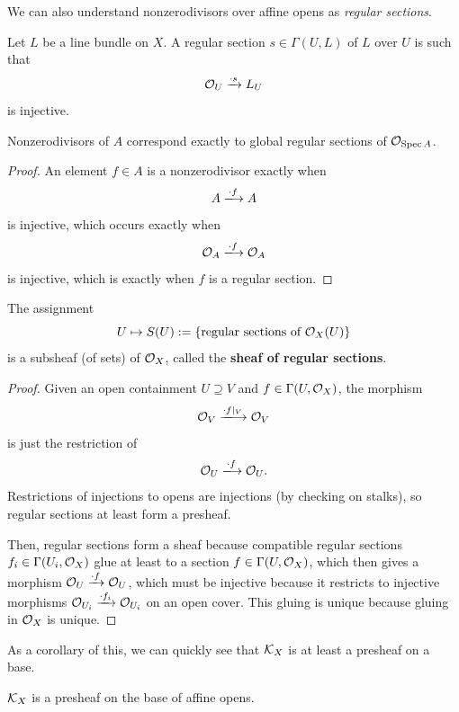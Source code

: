 \documentclass[12pt]{article}
\begin{document}
We can also understand nonzerodivisors over affine opens as \textit{regular sections}.
\begin{defn}
    Let $L$ be a line bundle on $X$. A regular section $s\in \Gamma(U,L)$ of $L$ over $U$ is such that
    \[\mathcal{O}_U \xrightarrow{\cdot s} L_U\]
    is injective.
\end{defn}

\begin{prop}
    Nonzerodivisors of $A$ correspond exactly to global regular sections of $\mathcal{O}_{\operatorname{Spec} A}$.
\end{prop}
\begin{proof}
    An element $f\in A$ is a nonzerodivisor exactly when
    \[A \xlongrightarrow{\cdot f} A\]
    is injective, which occurs exactly when
    \[\cO_A \xlongrightarrow{\cdot f} \cO_A\]
    is injective, which is exactly when $f$ is a regular section.
\end{proof}

\begin{prop}
    The assignment
    \[U \mapsto S(U):= \{\text{regular sections of $\mathcal{O}_X(U)$}\}\]
    is a subsheaf (of sets) of $\mathcal{O}_X$, called the \textbf{sheaf of regular sections}.
\end{prop}

\begin{proof}
    Given an open containment $U\supseteq V$ and $f\in \Gamma(U,\mathcal{O}_X)$, the morphism
    \[\cO_V \xlongrightarrow{\cdot f|_V} \cO_V\]
    is just the restriction of
    \[\cO_U \xlongrightarrow{\cdot f} \cO_U.\]
    Restrictions of injections to opens are injections (by checking on stalks), so regular sections at least form a presheaf.

    Then, regular sections form a sheaf because compatible regular sections $f_i\in \Gamma(U_i,\mathcal{O}_X)$ glue at least to a section $f\in \Gamma(U,\mathcal{O}_X)$, which then gives a morphism $\mathcal{O}_U\xrightarrow{\cdot f} \mathcal{O}_U$, which must be injective because it restricts to injective morphisms $\mathcal{O}_{U_i} \xrightarrow{\cdot f_i} \mathcal{O}_{U_i}$ on an open cover. This gluing is unique because gluing in $\mathcal{O}_X$ is unique.
\end{proof}

As a corollary of this, we can quickly see that $\mathcal{K}_X$ is at least a presheaf on a base.
\begin{cor}
    $\mathcal{K}_X$ is a presheaf on the base of affine opens.
\end{cor}
\end{document}
